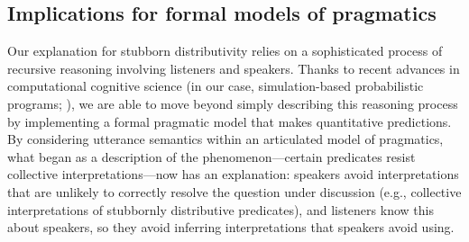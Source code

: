 \documentclass[preprint,12pt,authoryear,titlepage]{elsarticle}
\newcommand{\ndg}[1]{\textcolor{Green}{[ndg: #1]}}
\begin{document}



\subsection{Implications for formal models of pragmatics}


Our explanation for stubborn distributivity relies on a sophisticated process of recursive reasoning involving listeners and speakers. 
Thanks to recent advances in computational cognitive science (in our case, simulation-based probabilistic programs; \citealp{goodmanetal2015concepts}), we are able to move beyond simply describing this reasoning process by implementing a formal pragmatic model that makes quantitative predictions. 
By considering utterance semantics within an articulated model of pragmatics, what began as a description of the phenomenon---certain predicates resist collective interpretations---now has an explanation: speakers avoid interpretations that are unlikely to correctly resolve the question under discussion (e.g., collective interpretations of stubbornly distributive predicates), and listeners know this about speakers, so they avoid inferring interpretations that speakers avoid using.
\end{document}
